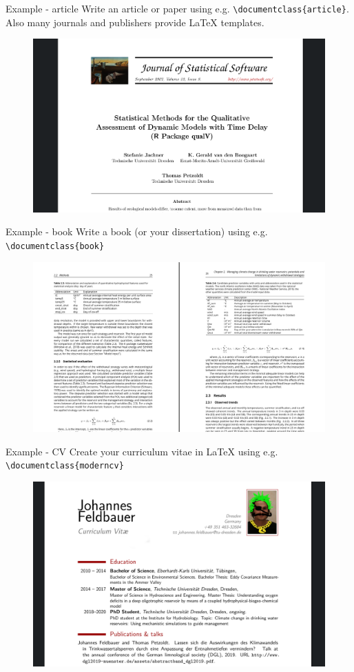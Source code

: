\documentclass[presentation, aspectratio=1610]{beamer}
\begin{document}
	\begin{frame}{Example - article}
		Write an article or paper using e.g. \texttt{\textbackslash{}documentclass\{article\}}. Also many journals and publishers
		provide \LaTeX{} templates.
		\begin{figure}
			\centering
			\includegraphics[width=.85\linewidth]{article_example}
		\end{figure}
	\end{frame}

	\begin{frame}{Example - book}
		Write a book (or your dissertation) using e.g. \texttt{\textbackslash{}documentclass\{book\}}
		\begin{figure}
			\centering
			\includegraphics[width=.85\linewidth]{book_example}
		\end{figure}
	\end{frame}

	\begin{frame}{Example - CV}
		Create your curriculum vitae in \LaTeX{} using e.g. \texttt{\textbackslash{}documentclass\{moderncv\}}
		\begin{figure}
			\centering
			\includegraphics[width=.85\linewidth]{CV_example}
		\end{figure}
	\end{frame}
\end{document}
